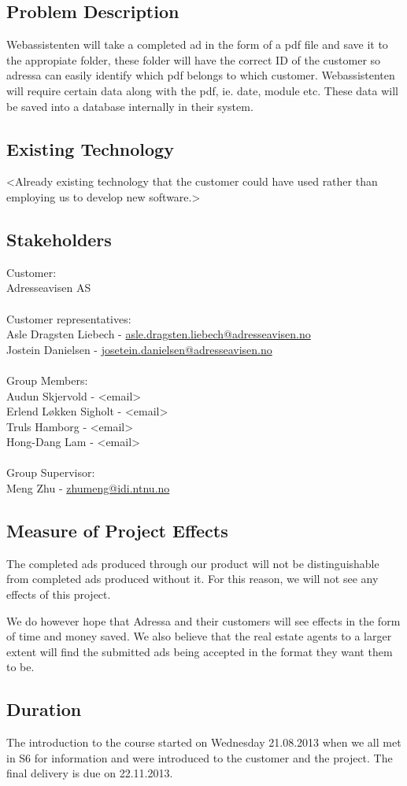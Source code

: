 \subsection{Problem Description}
Webassistenten will take a completed ad in the form of a pdf file and save it to the appropiate folder, these folder will have the correct ID of the customer so adressa can easily identify which pdf belongs to which customer.
Webassistenten will require certain data along with the pdf, ie. date, module etc. These data will be saved into a database internally in their system.

\subsection{Existing Technology}
<Already existing technology that the customer could have used rather than employing us to develop new software.> %

\subsection{Stakeholders}
Customer:\\
Adresseavisen AS\\
\\
Customer representatives:\\
Asle Dragsten Liebech - \href{mailto://asle.dragsten.liebech@adresseavisen.no}{asle.dragsten.liebech@adresseavisen.no}\\
Jostein Danielsen - \href{mailto://josetein.danielsen@adresseavisen.no}{josetein.danielsen@adresseavisen.no}\\
\\
Group Members:\\
Audun Skjervold - <email>\\
Erlend Løkken Sigholt - <email>\\
Truls Hamborg - <email>\\
Hong-Dang Lam - <email>\\
\\
Group Supervisor:\\
Meng Zhu - \href{mailto://zhumeng@idi.ntnu.no}{zhumeng@idi.ntnu.no}
\\
\subsection{Measure of Project Effects}
The completed ads produced through our product will not be distinguishable from completed ads produced without it. For this reason, we will not see any effects of this project.

We do however hope that Adressa and their customers will see effects in the form of time and money saved. We also believe that the real estate agents to a larger extent will find the submitted ads being accepted in the format they want them to be.
\subsection{Duration}
The introduction to the course started on Wednesday 21.08.2013 when we all met in S6 for information and were introduced to the customer and the project.
The final delivery is due on 22.11.2013.